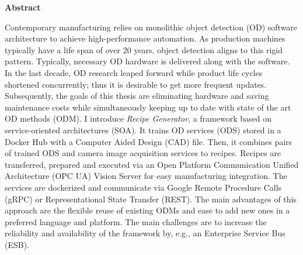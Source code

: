 \thispagestyle{empty}
\vspace*{1.0cm}

\begin{center}
    \textbf{Abstract}
\end{center}

\vspace*{0.5cm}

\noindent
Contemporary manufacturing relies on monolithic object detection (OD) software architecture to achieve high-performance automation. As production machines typically have a life span of over 20 years, object detection aligns to this rigid pattern. Typically, necessary OD hardware is delivered along with the software. In the last decade, OD research leaped forward while product life cycles shortened concurrently; thus it is desirable to get more frequent updates. Subsequently, the goals of this thesis are eliminating hardware and saving maintenance costs while simultaneously keeping up to date with state of the art OD methods (ODM). I introduce \textit{Recipe Generator}, a framework based on service-oriented architectures (SOA). It trains  OD services (ODS) stored in a Docker Hub with a Computer Aided Design (CAD) file. Then, it combines pairs of trained ODS and camera image acquisition services to recipes. Recipes are transferred, prepared and executed via an Open Platform Communication Unified Architecture (OPC UA) Vision Server for easy manufacturing integration. The services are dockerized and communicate via Google Remote Procedure Calls (gRPC) or Representational State Transfer (REST). The main advantages of this approach are the flexible reuse of existing ODMs and ease to add new ones in a preferred language and platform. The main challenges are to increase the reliability and availability of the framework by, e.g., an Enterprise Service Bus (ESB).